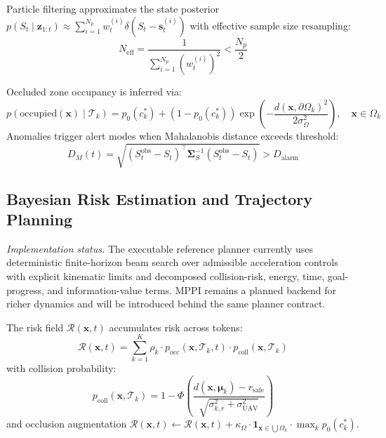 Particle filtering approximates the state posterior $p(S_t \mid \mathbf{z}_{1:t}) \approx \sum_{i=1}^{N_p} w_t^{(i)} \delta(S_t - \mathbf{s}_t^{(i)})$ with effective sample size resampling:
\begin{equation}
  N_{\text{eff}} = \frac{1}{\sum_{i=1}^{N_p} (w_t^{(i)})^2} < \frac{N_p}{2}
\end{equation}

Occluded zone occupancy is inferred via:
\begin{equation}
  p(\text{occupied}(\mathbf{x}) \mid \mathcal{T}_k) = p_0(c_k^*) + (1 - p_0(c_k^*)) \exp\left(-\frac{d(\mathbf{x}, \partial \Omega_k)^2}{2\sigma_\Omega^2}\right), \quad \mathbf{x} \in \Omega_k
\end{equation}
Anomalies trigger alert modes when Mahalanobis distance exceeds threshold:
\begin{equation}
  D_M(t) = \sqrt{(S_t^{\text{obs}} - S_t)^\top \mathbf{\Sigma}_S^{-1} (S_t^{\text{obs}} - S_t)} > D_{\text{alarm}}
\end{equation}

\subsection{Bayesian Risk Estimation and Trajectory Planning}
\label{subsec:bayesian_risk_planning}

\emph{Implementation status.} The executable reference planner currently uses deterministic finite-horizon beam search over admissible acceleration controls with explicit kinematic limits and decomposed collision-risk, energy, time, goal-progress, and information-value terms. MPPI remains a planned backend for richer dynamics and will be introduced behind the same planner contract.

The risk field $\mathcal{R}(\mathbf{x}, t)$ accumulates risk across tokens:
\begin{equation}
  \mathcal{R}(\mathbf{x}, t) = \sum_{k=1}^K \rho_k \cdot p_{\text{occ}}(\mathbf{x}, \mathcal{T}_k, t) \cdot p_{\text{coll}}(\mathbf{x}, \mathcal{T}_k)
\end{equation}
with collision probability:
\begin{equation}
  p_{\text{coll}}(\mathbf{x}, \mathcal{T}_k) = 1 - \Phi\left(\frac{d(\mathbf{x}, \boldsymbol{\mu}_k) - r_{\text{safe}}}{\sqrt{\sigma_{k,r}^2 + \sigma_{\text{UAV}}^2}}\right)
\end{equation}
and occlusion augmentation $\mathcal{R}(\mathbf{x}, t) \leftarrow \mathcal{R}(\mathbf{x}, t) + \kappa_\Omega \cdot \mathbf{1}_{\mathbf{x} \in \bigcup \Omega_k} \cdot \max_k p_0(c_k^*)$.

